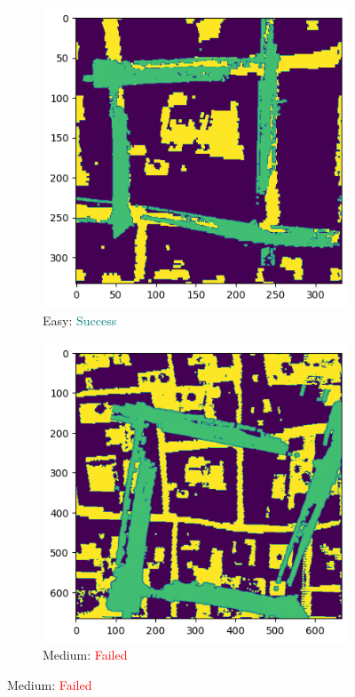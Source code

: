 \documentclass[11pt]{article}
\begin{document}
    \newpage
    \begin{figure}[p]
        \centering
        \begin{subfigure}{0.45\textwidth}
            \centering
            \includegraphics[width=\linewidth]{images/full/easy/4_3_3_easy}
            \caption{Easy: \textcolor{teal}{Success}}
            \label{fig:4_3_3_easy}
        \end{subfigure}
        \hfill
        \begin{subfigure}{0.45\textwidth}
            \centering
            \includegraphics[width=\linewidth]{images/full/medium/4_3_3_medium}
            \caption{Medium: \textcolor{red}{Failed}}
            \label{fig:4_3_3_medium}
        \end{subfigure}


\end{figure}
\end{document}
